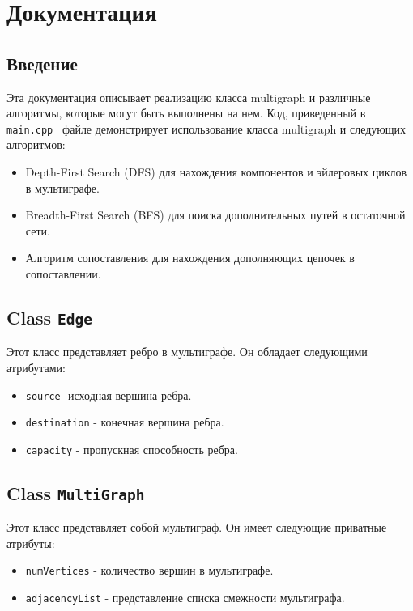 \documentclass{article}
\begin{document}
\section*{Документация}

\subsection*{Введение}
Эта документация описывает реализацию класса multigraph и различные алгоритмы, которые могут быть выполнены на нем. Код, приведенный в \texttt{main.cpp } файле демонстрирует использование класса multigraph и следующих алгоритмов:

\begin{itemize}
    \item Depth-First Search (DFS) для нахождения компонентов и эйлеровых циклов в мультиграфе.
    \item Breadth-First Search (BFS) для поиска дополнительных путей в остаточной сети.
    \item Алгоритм сопоставления для нахождения дополняющих цепочек в сопоставлении.
\end{itemize}

\subsection*{Class \texttt{Edge}}
Этот класс представляет ребро в мультиграфе. Он обладает следующими атрибутами:

\begin{itemize}
    \item \texttt{source} -исходная вершина ребра.
    \item \texttt{destination} - конечная вершина ребра.
    \item \texttt{capacity} - пропускная способность ребра.
\end{itemize}

\subsection*{Class \texttt{MultiGraph}}
Этот класс представляет собой мультиграф. Он имеет следующие приватные атрибуты:
\begin{itemize}
    \item \texttt{numVertices} - количество вершин в мультиграфе.
    \item \texttt{adjacencyList} - представление списка смежности мультиграфа.
\end{itemize}
\end{document}
